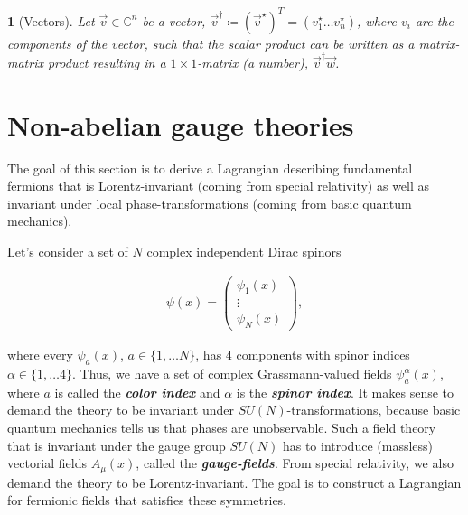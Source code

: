 \documentclass{article}
\theoremstyle{plain} %
\theoremstyle{convention} %
\newtheorem*{convention}{} %
\theoremstyle{remark} %
\def\df#1{\textbf{\textit{#1}}}
\numberwithin{equation}{section}
\begin{document}
\begin{convention}[Vectors]
  Let $\vec{v} \in \mathbb{C}^n$ be a vector, $\vec{v}^{\dagger} \coloneqq (\vec{v}^{\star})^T = (v^{\star}_1 \dots v^{\star}_n)$, where $v_i$ are the components of the vector, such that the scalar product can be written as a matrix-matrix product resulting in a $1 \times 1$-matrix (a number), $\vec{v}^{\dagger} \vec{w}$.
\end{convention}

\newpage

\section{Non-abelian gauge theories}

\label{sec:gauge_theories}

The goal of this section is to derive a Lagrangian describing fundamental fermions that is Lorentz-invariant (coming from special relativity) as well as invariant under local phase-transformations (coming from basic quantum mechanics).

Let's consider a set of $N$ complex independent Dirac spinors

\begin{align*}
    \psi(x) = \begin{pmatrix}
    \psi_1(x) \\
    \vdots \\
    \psi_N(x) 
    \end{pmatrix},
\end{align*}

where every $\psi_a(x)$, $a \in \{1, \dots N\}$, has $4$ components with spinor indices $\alpha \in \{1, \dots 4\}$. Thus, we have a set of complex Grassmann-valued fields $\psi_{a}^{\alpha}(x)$, where $a$ is called the \df{color index} and $\alpha$ is the \df{spinor index}. It makes sense to demand the theory to be invariant under $SU(N)$-transformations, because basic quantum mechanics tells us that phases are unobservable. Such a field theory that is invariant under the gauge group $SU(N)$ has to introduce (massless) vectorial fields $A_{\mu}(x)$, called the \df{gauge-fields}. From special relativity, we also demand the theory to be Lorentz-invariant. The goal is to construct a Lagrangian for fermionic fields that satisfies these symmetries.
\end{document}
